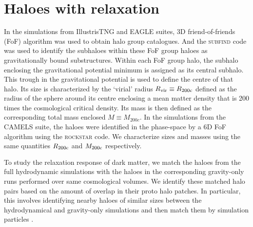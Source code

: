 \section{Haloes with relaxation}
In the simulations from IllustrisTNG and EAGLE suites, 3D friend-of-friends (FoF) algorithm \citep[see][for details]{2016A&C....15...72M,2019ComAC...6....2N} was used to obtain halo group catalogues. And the \textsc{subfind} code \citep{2001MNRAS.328..726S} was used to identify the subhaloes within these FoF group haloes as gravitationally bound substructures. Within each FoF group halo, the subhalo enclosing the gravitational potential minimum is assigned as its central subhalo. This trough in the gravitational potential is used to define the centre of that halo. Its size is characterized by the `virial' radius $R_{\rm vir}\equiv R_{\rm 200c}$ defined as the radius of the sphere around its centre enclosing a mean matter density that is 200 times the cosmological critical density. Its mass is then defined as the corresponding total mass enclosed $M\equiv M_{200c}$. In the simulations from the CAMELS suite, the haloes were identified in the  phase-space by a 6D FoF algorithm using the \textsc{rockstar} code. We characterize sizes and masses using the same quantities  $R_{\rm 200c}$ and $M_{\rm 200c}$ respectively.

To study the relaxation response of dark matter, we match the haloes from the full hydrodynamic simulations with the haloes in the corresponding gravity-only runs performed over same cosmological volumes. We identify these matched halo pairs based on the amount of overlap in their proto halo patches. In particular, this involves identifying nearby haloes of similar sizes between the hydrodynamical and gravity-only simulations and then match them by simulation particles \cite{2023Velmani&Paranjape}.


